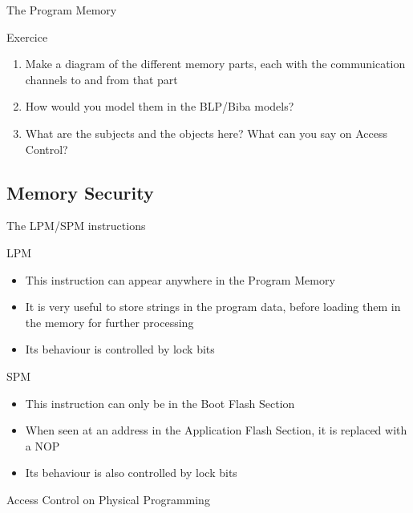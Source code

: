 \begin{reveals}
\begin{frame}{The Program Memory}
\end{frame}


\begin{frame}[c]{Exercice}
  
  \begin{enumerate}
  \item Make a diagram of the different memory parts, each with the
    communication channels to and from that part
  \item How would you model them in the BLP/Biba models?
  \item What are the subjects and the objects here? What can you say
    on Access Control?
  \end{enumerate}

\end{frame}

\subsection{Memory Security}

\begin{frame}{The LPM/SPM instructions}
  
  \begin{block}{LPM}
    \begin{itemize}
    \item This instruction can appear anywhere in the Program Memory
    \item It is very useful to store strings in the program data,
      before loading them in the memory for further processing
    \item Its behaviour is controlled by lock bits
    \end{itemize}
  \end{block}

  \vfill

  \begin{block}{SPM}
    \begin{itemize}
    \item This instruction can only be in the Boot Flash Section
    \item When seen at an address in the Application Flash Section, it
      is replaced with a NOP
    \item Its behaviour is also controlled by lock bits
    \end{itemize}
  \end{block}

\end{frame}

\begin{frame}[c]{Access Control on Physical Programming}
  

\end{frame}
\end{reveals}
